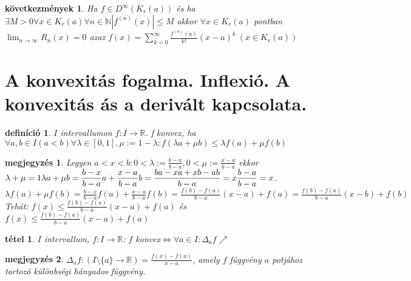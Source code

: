 \documentclass{article}
\newcommand{\fir}{f\colon I\rightarrow\mathbb{R}}
\newcommand{\ek}{\Longleftrightarrow}
\newcommand{\la}{\lambda}
\newcommand{\R}{\mathbb{R}}
\newcommand{\N}{\mathbb{N}}
\newcommand{\n}{\rightarrow}
\newcommand{\di}{\displaystyle}
\theoremstyle{magyar}
\newtheorem{de}{definíció}[section]
\newtheorem{te}{tétel}[section]
\newtheorem{ko}{következmények}[section]
\newtheorem{me}{megjegyzés}[section]
\begin{document}
  \begin{ko}
    Ha $f\in D^\infty(K_r(a))$ és ha $\exists M>0 \forall  x\in K_r(a) \forall n\in\N |f^{(n)}(x)|\le M$ akkor $\forall x\in K_r(a)$ pontban $\di\lim_{n\n\infty}R_n(x)=0$ azaz $f(x)=\di\sum_{k=0}^\infty\frac{f^{(n)}(a)}{k!}(x-a)^k\ (x\in K_r(a))$
  \end{ko}
  \newpage
  \section{A konvexitás fogalma. Inflexió. A konvexitás ás a derivált kapcsolata.}
  \begin{de}
    $I$ intervallumon $\fir$. f konvex, ha $\forall a,b\in I(a<b) \forall \la\in[0,1], \mu:=1-\la: f(\la{a}+\mu{b})\le \la f(a)+\mu f(b)$
  \end{de}
  \begin{me}
    Legyen $a<x<b:0<\la:=\di\frac{b-x}{b-a},0<\mu:=\frac{x-a}{b-a}$ ekkor $\la+\mu=1\\ \la a+\mu b=\di\frac{b-x}{b-a}a+\frac{x-a}{b-a}b=\frac{ba-xa+xb-ab}{b-a}=x\frac{b-a}{b-a}=x$. $\la f(a)+\mu f(b)=\di\frac{b-x}{b-a}f(a)+\frac{x-a}{b-a}f(b)=\frac{f(b)-f(a)}{b-a}(x-a)+f(a)=\frac{f(b)-f(a)}{b-a}(x-b)+f(b)$\\
    Tehát: $f(x)\le\frac{f(b)-f(a)}{b-a}(x-a)+f(a)$ és $f(x)\le\frac{f(b)-f(a)}{b-a}(x-a)+f(a)$
  \end{me}
  \begin{te}
    $I$ intervallum, $\fir$: $f$ konvex$\ek\forall a\in I:\Delta_af\nearrow$
  \end{te}
  \begin{me}
    $\Delta_af:(I\setminus\{a\}\n\R)=\frac{f(x)-f(a)}{x-a}$, amely $f$ függvény $a$ potjához tartozó különbségi hányados függvény.
  \end{me}
\end{document}
